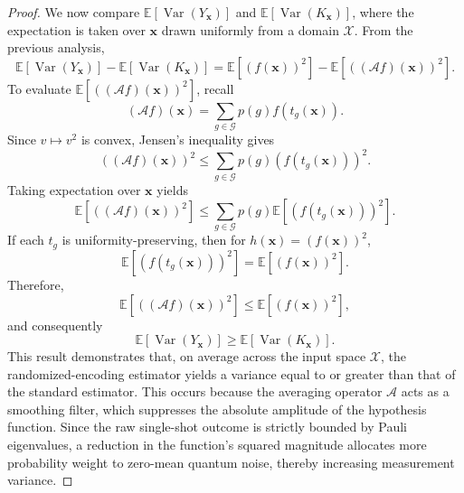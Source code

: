 \documentclass[%
 reprint,
 amsmath,amssymb,
 aps,
 pra,
]{revtex4-2}
\theoremstyle{definition}
\begin{document}
\begin{proof}
We now compare \(\mathbb{E}[\operatorname{Var}(Y_{\bm{x}})]\) and \(\mathbb{E}[\operatorname{Var}(K_{\bm{x}})]\), where the expectation is taken over \(\bm{x}\) drawn uniformly from a domain \(\mathcal{X}\). From the previous analysis,
\begin{equation}
\mathbb{E}[\operatorname{Var}(Y_{\bm{x}})] - \mathbb{E}[\operatorname{Var}(K_{\bm{x}})]
= \mathbb{E}\left[(f(\bm{x}))^2\right] - \mathbb{E}\left[((\mathcal{A}f)(\bm{x}))^2\right].
\end{equation}
To evaluate \(\mathbb{E}[((\mathcal{A}f)(\bm{x}))^2]\), recall
\begin{equation}
(\mathcal{A}f)(\bm{x}) = \sum_{g \in \mathcal{G}} p(g) f(t_g(\bm{x})).
\end{equation}
Since \(v\mapsto v^2\) is convex, Jensen's inequality gives
\begin{equation}
((\mathcal{A}f)(\bm{x}))^2
\leq
\sum_{g \in \mathcal{G}} p(g) \left( f(t_g(\bm{x})) \right)^2.
\end{equation}
Taking expectation over \(\bm{x}\) yields
\begin{equation}
\mathbb{E}\left[((\mathcal{A}f)(\bm{x}))^2\right]
\leq
\sum_{g \in \mathcal{G}} p(g) \mathbb{E}\left[ \left( f(t_g(\bm{x})) \right)^2 \right].
\end{equation}
If each \(t_g\) is uniformity-preserving, then for \(h(\bm{x})=(f(\bm{x}))^2\),
\begin{equation}
\mathbb{E}\left[ \left( f(t_g(\bm{x})) \right)^2 \right]
=
\mathbb{E}\left[(f(\bm{x}))^2\right].
\end{equation}
Therefore,
\begin{equation}
\mathbb{E}\left[((\mathcal{A}f)(\bm{x}))^2\right]
\leq
\mathbb{E}\left[(f(\bm{x}))^2\right],
\end{equation}
and consequently
\begin{equation}
\mathbb{E}[\operatorname{Var}(Y_{\bm{x}})]
\geq
\mathbb{E}[\operatorname{Var}(K_{\bm{x}})].
\end{equation}
This result demonstrates that, on average across the input space \(\mathcal{X}\), the randomized-encoding estimator yields a variance equal to or greater than that of the standard estimator. This occurs because the averaging operator \(\mathcal{A}\) acts as a smoothing filter, which suppresses the absolute amplitude of the hypothesis function. Since the raw single-shot outcome is strictly bounded by Pauli eigenvalues, a reduction in the function's squared magnitude allocates more probability weight to zero-mean quantum noise, thereby increasing measurement variance.
\end{proof}
\end{document}
